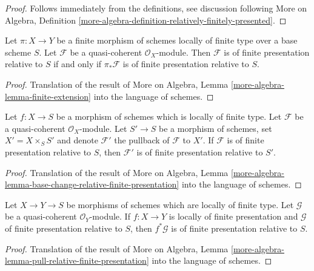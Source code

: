 \begin{proof}
Follows immediately from the definitions, see
discussion following
More on Algebra, Definition
\ref{more-algebra-definition-relatively-finitely-presented}.
\end{proof}

\begin{lemma}
\label{lemma-finite-morphism-relative-finite-presentation}
Let $\pi : X \to Y$ be a finite morphism of schemes locally of finite
type over a base scheme $S$. Let $\mathcal{F}$ be a quasi-coherent
$\mathcal{O}_X$-module. Then $\mathcal{F}$ is of finite presentation
relative to $S$ if and only if $\pi_*\mathcal{F}$ is of finite presentation
relative to $S$.
\end{lemma}

\begin{proof}
Translation of the result of
More on Algebra, Lemma \ref{more-algebra-lemma-finite-extension}
into the language of schemes.
\end{proof}

\begin{lemma}
\label{lemma-base-change-relative-finite-presentation}
Let $f : X \to S$ be a morphism of schemes which is locally of finite
type. Let $\mathcal{F}$ be a quasi-coherent $\mathcal{O}_X$-module.
Let $S' \to S$ be a morphism of schemes, set $X' = X \times_S S'$
and denote $\mathcal{F}'$ the pullback of $\mathcal{F}$ to $X'$.
If $\mathcal{F}$ is of finite presentation relative to $S$, then
$\mathcal{F}'$ is of finite presentation relative to $S'$.
\end{lemma}

\begin{proof}
Translation of the result of
More on Algebra, Lemma
\ref{more-algebra-lemma-base-change-relative-finite-presentation}
into the language of schemes.
\end{proof}

\begin{lemma}
\label{lemma-pull-relative-finite-presentation}
Let $X \to Y \to S$ be morphisms of schemes which are locally of finite
type. Let $\mathcal{G}$ be a quasi-coherent $\mathcal{O}_Y$-module.
If $f : X \to Y$ is locally of finite presentation and
$\mathcal{G}$ of finite presentation relative to $S$, then
$f^*\mathcal{G}$ is of finite presentation relative to $S$.
\end{lemma}

\begin{proof}
Translation of the result of
More on Algebra, Lemma
\ref{more-algebra-lemma-pull-relative-finite-presentation}
into the language of schemes.
\end{proof}

